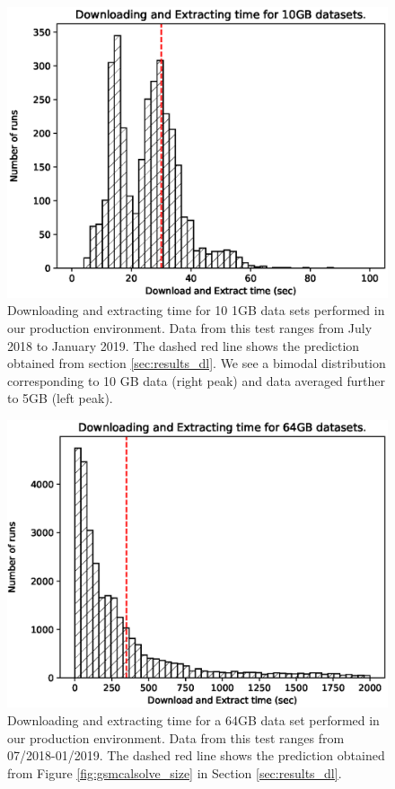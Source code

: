 \documentclass[preprint,5p]{elsarticle}
\begin{document}
\begin{figure}
    \includegraphics[width=0.95\linewidth]{figures/Production_10GB_2.eps}
      \caption{Downloading and extracting time for 10 1GB data sets performed in our production environment. Data from this test ranges from July 2018 to January 2019. The dashed red line shows the prediction obtained from section \ref{sec:results_dl}. We see a bimodal distribution corresponding to 10 GB data (right peak) and data averaged further to 5GB (left peak).}
	\label{fig:prod_dl_10}
\end{figure}


\begin{figure}
    \includegraphics[width=0.95\linewidth]{figures/Production_64GB_2.eps}
      \caption{Downloading and extracting time for a 64GB data set performed in our production environment. Data from this test ranges from 07/2018-01/2019. The dashed red line shows the prediction obtained from Figure \ref{fig:gsmcalsolve_size} in Section \ref{sec:results_dl}. }
	\label{fig:prod_dl_64}
\end{figure}
\end{document}

